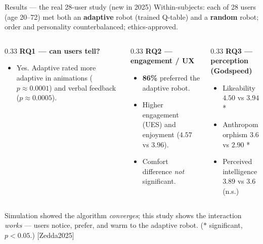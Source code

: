 \documentclass[aspectratio=169,10pt]{beamer}
\newcommand{\refnum}[1]{{\footnotesize\color{giuaccent}[#1]}}
\begin{document}
\begin{frame}{Results --- the real 28-user study (new in 2025)}
  \footnotesize Within-subjects: each of 28 users (age 20--72) met both an \textbf{adaptive} robot (trained Q-table) and a \textbf{random} robot; order and personality counterbalanced; ethics-approved.
  \vspace{0.3em}
  \begin{columns}[T]
    \begin{column}{0.33\textwidth}
      \textbf{RQ1 --- can users tell?}
      \begin{itemize}\footnotesize
        \item Yes. Adaptive rated more adaptive in animations ($p{\approx}0.0001$) and verbal feedback ($p{\approx}0.0005$).
      \end{itemize}
    \end{column}
    \begin{column}{0.33\textwidth}
      \textbf{RQ2 --- engagement / UX}
      \begin{itemize}\footnotesize
        \item \textbf{86\%} preferred the adaptive robot.
        \item Higher engagement (UES) and enjoyment ($4.57$ vs $3.96$).
        \item Comfort difference \emph{not} significant.
      \end{itemize}
    \end{column}
    \begin{column}{0.33\textwidth}
      \textbf{RQ3 --- perception (Godspeed)}
      \begin{itemize}\footnotesize
        \item Likeability $4.50$ vs $3.94$ *
        \item Anthropomorphism $3.6$ vs $2.90$ *
        \item Perceived intelligence $3.89$ vs $3.6$ (n.s.)
      \end{itemize}
    \end{column}
  \end{columns}
  \vspace{0.3em}
  \begin{block}{}
    \footnotesize Simulation showed the algorithm \emph{converges}; this study shows the interaction \emph{works} --- users notice, prefer, and warm to the adaptive robot. ($*$ significant, $p<0.05$.) \refnum{Zedda2025}
  \end{block}
\end{frame}
 
\end{document}
